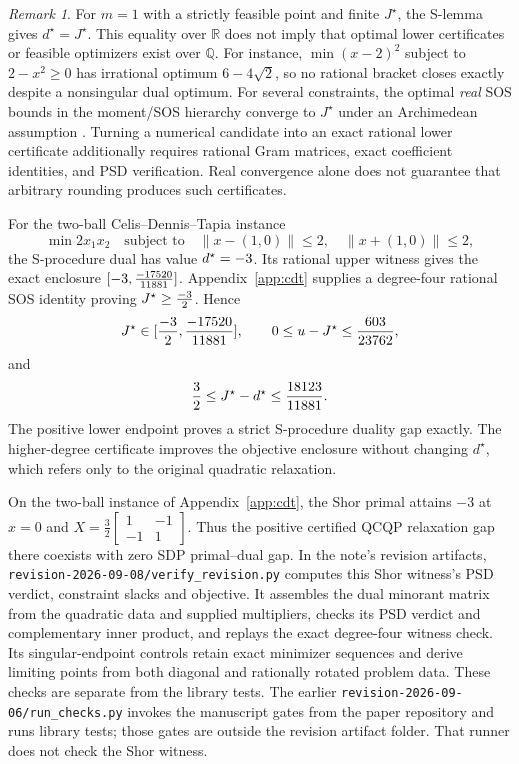 \documentclass[11pt]{article}
\newcommand{\R}{\mathbb{R}}
\newcommand{\Q}{\mathbb{Q}}
\theoremstyle{plain}
\theoremstyle{remark}
\newtheorem*{remark}{Remark}
\begin{document}
\begin{remark}
For $m=1$ with a strictly feasible point and finite $J^\star$, the S-lemma gives
$d^\star=J^\star$. This equality over $\R$ does not imply that optimal lower
certificates or feasible optimizers exist over $\Q$. For instance,
$\min(x-2)^2$ subject to $2-x^2\ge0$ has irrational optimum $6-4\sqrt2$,
so no rational bracket closes exactly despite a nonsingular dual optimum.
For several constraints, the optimal \emph{real} SOS bounds in the
moment/SOS hierarchy converge to $J^\star$ under an Archimedean assumption
\cite{lasserre2001}. Turning a numerical candidate into an exact rational lower
certificate additionally requires rational Gram matrices, exact coefficient
identities, and PSD verification. Real convergence alone does not guarantee
that arbitrary rounding produces such certificates.
\end{remark}

For the two-ball Celis--Dennis--Tapia instance~\cite{celis1985}
\[
\min 2x_1x_2\quad\text{subject to}\quad
\lVert x-(1,0)\rVert\le2,\quad\lVert x+(1,0)\rVert\le2,
\]
the S-procedure dual has value $d^\star=-3$. Its rational upper
witness gives the exact enclosure $[-3,\frac{-17520}{11881}]$.
Appendix~\ref{app:cdt} supplies a degree-four rational SOS identity proving
$J^\star\ge\frac{-3}{2}$. Hence
\[
J^\star\in[\frac{-3}{2},\frac{-17520}{11881}],\qquad
0\le u-J^\star\le\frac{603}{23762},
\]
and
\[
\frac{3}{2}\le J^\star-d^\star\le\frac{18123}{11881}.
\]
The positive lower endpoint proves a strict S-procedure duality gap exactly.
The higher-degree certificate improves the objective enclosure without changing
$d^\star$, which refers only to the original quadratic relaxation.

On the two-ball instance of Appendix~\ref{app:cdt}, the Shor primal
attains $-3$ at $x=0$ and $X=\tfrac32\left[\begin{smallmatrix}1&-1\\-1&1\end{smallmatrix}\right]$.
Thus the positive certified QCQP relaxation gap there coexists with zero
SDP primal--dual gap. In the note's revision artifacts,
\texttt{revision-2026-09-08/verify\_revision.py} computes this Shor witness's
PSD verdict, constraint slacks and objective. It assembles the dual minorant
matrix from the quadratic data and supplied multipliers, checks its PSD
verdict and complementary inner product, and replays the exact degree-four
witness check. Its singular-endpoint controls retain exact minimizer
sequences and derive limiting points from both diagonal and rationally
rotated problem data. These checks are separate from the library tests.
The earlier \texttt{revision-2026-09-06/run\_checks.py} invokes the
manuscript gates from the paper repository and runs library tests; those
gates are outside the revision artifact folder. That runner does not check
the Shor witness.
\end{document}
